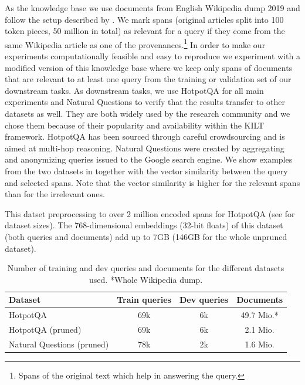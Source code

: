 As the knowledge base we use documents from English Wikipedia dump 2019 and follow the setup described by \citet{petroni2021kilt}.
We mark spans (original articles split into 100 token pieces, 50 million in total) as relevant for a query if they come from the same Wikipedia article as one of the provenances.\footnote{Spans of the original text which help in answering the query.}
In order to make our experiments computationally feasible and easy to reproduce we experiment with a modified version of this knowledge base where we keep only spans of documents that are relevant to at least one query from the training or validation set of our downstream tasks.
As downstream tasks, we use HotpotQA \citep{yang2018hotpotqa} for all main experiments and Natural Questions \citep{kwiatkowski2019natural} to verify that the results transfer to other datasets as well.
They are both widely used by the research community \citep{chakravarti2020towards,luo2021simple,lia2021synchronous,ding2021reasoning,gontier2022does,bonifacio2022inpars} and we chose them because of their popularity and availability within the KILT framework.
HotpotQA has been sourced through careful crowdsourcing and is aimed at multi-hop reasoning.
Natural Questions were created by aggregating and anonymizing queries issued to the Google search engine.
We show examples from the two datasets in  together with the vector similarity between the query and selected spans.
Note that the vector similarity is higher for the relevant spans than for the irrelevant ones.

This datset preprocessing to over 2 million encoded spans for HotpotQA (see  for dataset sizes).
The 768-dimensional embeddings (32-bit floats) of this dataset (both queries and documents) add up to 7GB (146GB for the whole unpruned dataset).


\begin{table}[ht]
    \center
    \renewcommand{\arraystretch}{1.3} %
    \begin{tabular}{lccc}
        \toprule
        \textbf{Dataset}           & \textbf{Train queries} & \textbf{Dev queries} & \textbf{Documents} \\
        \midrule
        HotpotQA                   & 69k                    & 6k                   & 49.7 Mio.*         \\
        HotpotQA (pruned)          & 69k                    & 6k                   & 2.1 Mio.           \\
        Natural Questions (pruned) & 78k                    & 2k                   & 1.6 Mio.           \\
        \bottomrule
    \end{tabular}
    \caption{Number of training and dev queries and documents for the different datasets used. *Whole Wikipedia dump.}
    \label{tab:dataset_size}
\end{table}


